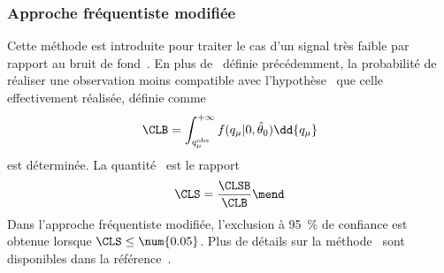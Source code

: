 \subsubsection{Approche fréquentiste modifiée}
Cette méthode est introduite pour traiter le cas d'un signal très faible par rapport au bruit de fond~\cite{Junk:1999kv,CLs_method,Read_2002}.
En plus de \CLSB\ définie précédemment,
la probabilité de réaliser une observation moins compatible avec l'hypothèse \hypB\ que celle effectivement réalisée, définie comme
\begin{equation}
\CLB = \int_{q_{\mu}^\text{obs}}^{+\infty} f (q_\mu | 0, \hat{\theta}_0) \dd{q_\mu}
\end{equation}
est déterminée.
La quantité \CLS\ est le rapport
\begin{equation}
\CLS = \frac{\CLSB}{\CLB}
\mend
\end{equation}
Dans l'approche fréquentiste modifiée, l'exclusion à \SI{95}{\%} de confiance est obtenue lorsque $\CLS \leq \num{0.05}$.
Plus de détails sur la méthode \CLS\ sont disponibles dans la référence~\cite{CMS-NOTE-2011-005}.